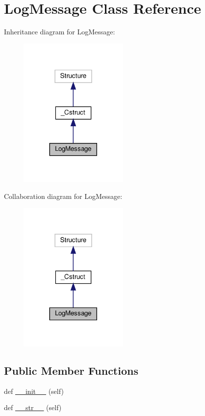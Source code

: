 \hypertarget{classvlc_1_1_log_message}{}\section{Log\+Message Class Reference}
\label{classvlc_1_1_log_message}


Inheritance diagram for Log\+Message\+:
\nopagebreak
\begin{figure}[H]
\begin{center}
\leavevmode
\includegraphics[width=152pt]{classvlc_1_1_log_message__inherit__graph}
\end{center}
\end{figure}


Collaboration diagram for Log\+Message\+:
\nopagebreak
\begin{figure}[H]
\begin{center}
\leavevmode
\includegraphics[width=152pt]{classvlc_1_1_log_message__coll__graph}
\end{center}
\end{figure}
\subsection*{Public Member Functions}
\begin{DoxyCompactItemize}
\item 
def \hyperlink{classvlc_1_1_log_message_ae64f0875afe3067b97ba370b354b9213}{\+\_\+\+\_\+init\+\_\+\+\_\+} (self)
\item 
def \hyperlink{classvlc_1_1_log_message_a23e8041ce1015febe4fdace3225714f9}{\+\_\+\+\_\+str\+\_\+\+\_\+} (self)
\end{DoxyCompactItemize}
